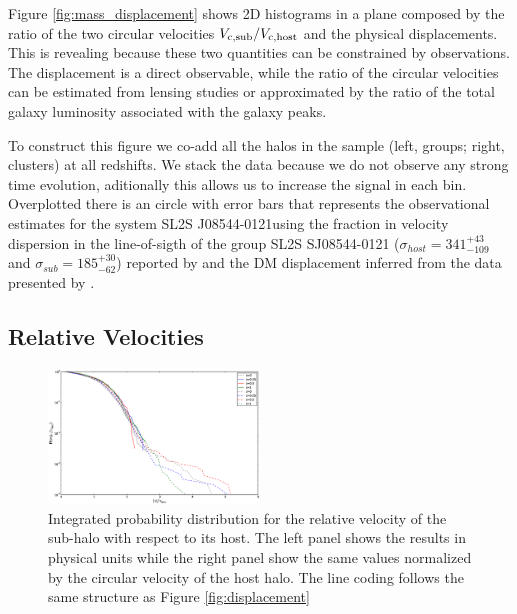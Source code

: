 \documentclass{emulateapj}
\newcommand{\kms}{{\ifmmode{{\mathrm{\,km\ s}^{-1}}}\else{\,km~s$^{-1}$}\fi}}
\newcommand{\bullg}{SL2S J08544-0121}
\begin{document}
Figure \ref{fig:mass_displacement} shows 2D histograms in a plane
composed by the ratio of the two circular velocities $V_{\rm c,
  sub}/V_{\rm c, host}$ and the physical displacements. This is
revealing because these two quantities can be constrained by
observations. The displacement is a direct observable, while the ratio
of the circular velocities can be estimated from lensing studies or
approximated by the ratio of the total galaxy luminosity associated
with the galaxy peaks.

To construct this figure we co-add all the halos in the sample (left,
groups; right, clusters) at all redshifts. We stack the data because
we do not observe any strong time evolution, aditionally this allows
us to increase the signal in each bin. Overplotted there is an circle
with error bars that represents the observational estimates for the
system \bullg using the fraction in velocity dispersion in
the line-of-sigth of the group SL2S SJ08544-0121
($\sigma_{host}=341^{+43}_{-109}$\kms and
$\sigma_{sub}=185^{+30}_{-62}$\kms) reported by
\citet{2013A&A...552A..80M} and the DM displacement inferred from the
data presented by \cite{Gastaldello}.


\subsection{Relative Velocities}
\label{sec:velocities}

\begin{figure}
\begin{center}
\includegraphics[width=0.5\textwidth]{Figures_eps/figure_3.eps}
\end{center}
\caption{Integrated probability distribution for the relative velocity of the
sub-halo with respect to its host. The left panel shows the results
in physical units while the right panel show the same values
normalized by the circular velocity of the host halo. The line coding
follows the same structure as Figure \ref{fig:displacement}}
\label{fig:velocities}
\end{figure}
\end{document}
